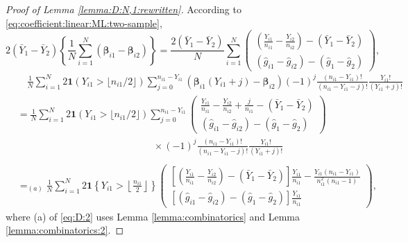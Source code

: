 \documentclass[10pt,a4paper]{amsart}
\begin{document}
\begin{proof}[Proof of Lemma \ref{lemma:D:N,1:rewritten}]
According to \eqref{eq:coefficient:linear:ML:two-sample}, 
\begin{equation}\label{eq:D:1}
2(\bar{Y}_1-\bar{Y}_2)\left\{\frac{1}{N}\sum_{i=1}^N(\boldsymbol{\beta}_{i1}-\boldsymbol{\beta}_{i2})\right\}=\frac{2(\bar{Y}_1-\bar{Y}_2)}{N}\sum_{i=1}^N\begin{pmatrix}
\displaystyle\left(\frac{Y_{i1}}{n_{i1}}-\frac{Y_{i2}}{n_{i2}}\right)-(\bar{Y}_1-\bar{Y}_2)\\
\displaystyle(\hat{g}_{i1}-\hat{g}_{i2})-(\hat{g}_1-\hat{g}_2)
\end{pmatrix},
\end{equation}
\begin{equation}\label{eq:D:2}
\begin{array}{rl}
&\displaystyle\quad\frac{1}{N}\sum_{i=1}^N2\mathbf{1}(Y_{i1} > \lfloor n_{i1}/2\rfloor)\!\!\!\sum_{j=0}^{n_{i1}-Y_{i1}}\!\!\!(\boldsymbol{\beta}_{i1}(Y_{i1}+j)-\boldsymbol{\beta}_{i2})(-1)^{j}\frac{(n_{i1}-Y_{i1})!}{(n_{i1}-Y_{i1}-j)!}\frac{Y_{i1}!}{(Y_{i1}+j)!}\\
&\displaystyle=\frac{1}{N}\sum_{i=1}^N2\mathbf{1}(Y_{i1} > \lfloor n_{i1}/2\rfloor)\!\!\!\sum_{j=0}^{n_{i1}-Y_{i1}}\!\!\!\begin{pmatrix}
\displaystyle\frac{Y_{i1}}{n_{i1}}-\frac{Y_{i2}}{n_{i2}}+\frac{j}{n_{i1}}-(\bar{Y}_1-\bar{Y}_2)\\
\displaystyle(\hat{g}_{i1}-\hat{g}_{i2})-(\hat{g}_1-\hat{g}_2)
\end{pmatrix}\\
&\quad\quad\quad\quad\quad\quad\quad\quad\quad\quad\quad\quad\quad\quad\displaystyle\times(-1)^{j}\frac{(n_{i1}-Y_{i1})!}{(n_{i1}-Y_{i1}-j)!}\frac{Y_{i1}!}{(Y_{i1}+j)!}\\
\\
&\displaystyle=_{(a)}\frac{1}{N}\sum_{i=1}^N2\mathbf{1}\left\{Y_{i1}>\left\lfloor\frac{n_{i1}}{2}\right\rfloor\right\}\begin{pmatrix}
\displaystyle\left[\left(\frac{Y_{i1}}{n_{i1}}-\frac{Y_{i2}}{n_{i2}}\right)-(\bar{Y}_1-\bar{Y}_2)\right]\frac{Y_{i1}}{n_{i1}}-\frac{Y_{i1}(n_{i1}-Y_{i1})}{n_{i1}^2(n_{i1}-1)}\\
\displaystyle[(\hat{g}_{i1}-\hat{g}_{i2})-(\hat{g}_1-\hat{g}_2)]\frac{Y_{i1}}{n_{i1}}
\end{pmatrix},
\end{array}
\end{equation}
where (a) of \eqref{eq:D:2} uses Lemma \ref{lemma:combinatorics} and Lemma \ref{lemma:combinatorics:2}. 

\end{proof}
\end{document}
